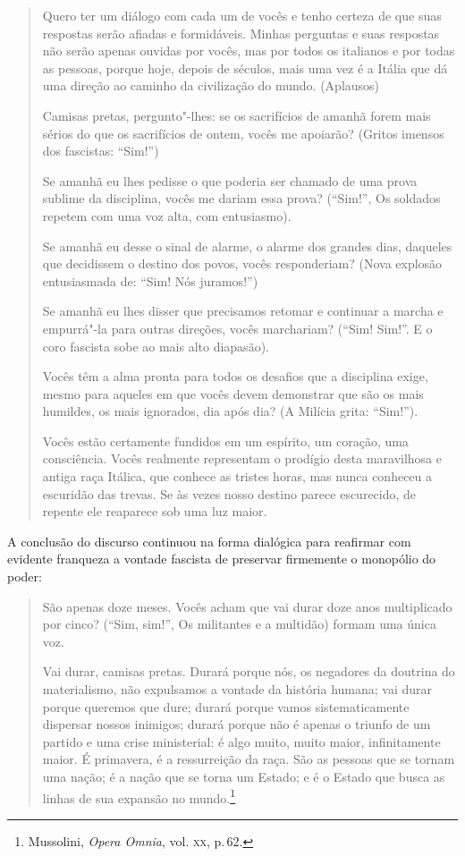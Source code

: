 \begin{quote}
Quero ter um diálogo com cada um de vocês e tenho certeza de que suas
respostas serão afiadas e formidáveis. Minhas perguntas e suas respostas
não serão apenas ouvidas por vocês, mas por todos os italianos e por
todas as pessoas, porque hoje, depois de séculos, mais uma vez é a
Itália que dá uma direção ao caminho da civilização do mundo. (Aplausos)

Camisas pretas, pergunto"-lhes: se os sacrifícios de amanhã forem mais
sérios do que os sacrifícios de ontem, vocês me apoiarão? (Gritos
imensos dos fascistas: ``Sim!'')

Se amanhã eu lhes pedisse o que poderia ser chamado de uma prova sublime
da disciplina, vocês me dariam essa prova? (``Sim!'', Os soldados repetem
com uma voz alta, com entusiasmo).

Se amanhã eu desse o sinal de alarme, o alarme dos grandes dias,
daqueles que decidissem o destino dos povos, vocês responderiam? (Nova
explosão entusiasmada de: ``Sim! Nós juramos!'')

Se amanhã eu lhes disser que precisamos retomar e continuar a marcha e
empurrá"-la para outras direções, vocês marchariam? (``Sim! Sim!''. E o
coro fascista sobe ao mais alto diapasão).

Vocês têm a alma pronta para todos os desafios que a disciplina exige,
mesmo para aqueles em que vocês devem demonstrar que são os mais
humildes, os mais ignorados, dia após dia? (A Milícia grita: ``Sim!'').

Vocês estão certamente fundidos em um espírito, um coração, uma
consciência. Vocês realmente representam o prodígio desta maravilhosa e
antiga raça Itálica, que conhece as tristes horas, mas nunca conheceu a
escuridão das trevas. Se às vezes nosso destino parece escurecido, de
repente ele reaparece sob uma luz maior.
\end{quote}

A conclusão do discurso continuou na forma dialógica para reafirmar com
evidente franqueza a vontade fascista de preservar firmemente o
monopólio do poder:

\begin{quote}
São apenas doze meses. Vocês acham que vai durar doze anos multiplicado
por cinco? (``Sim, sim!'', Os militantes e a multidão) formam uma única
voz.

Vai durar, camisas pretas. Durará porque nós, os negadores da doutrina
do materialismo, não expulsamos a vontade da história humana; vai durar
porque queremos que dure; durará porque vamos sistematicamente dispersar
nossos inimigos; durará porque não é apenas o triunfo de um partido e
uma crise ministerial: é algo muito, muito maior, infinitamente maior. É
primavera, é a ressurreição da raça. São as pessoas que se tornam uma
nação; é a nação que se torna um Estado; e é o Estado que busca as
linhas de sua expansão no mundo.\footnote{Mussolini, \emph{Opera Omnia},
  vol. \textsc{xx}, p.\,62.}
\end{quote}

